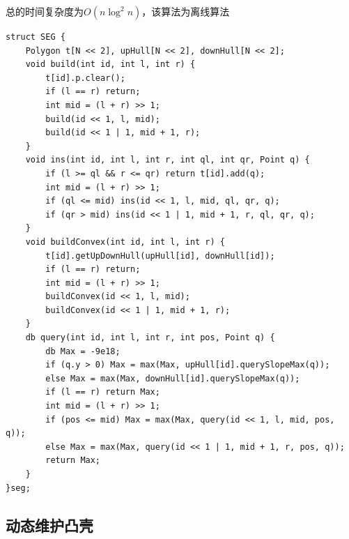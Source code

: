 总的时间复杂度为$O(n \log^2 n)$，该算法为离线算法\par

\begin{lstlisting}
struct SEG {
	Polygon t[N << 2], upHull[N << 2], downHull[N << 2]; 
	void build(int id, int l, int r) {
		t[id].p.clear();
		if (l == r) return;
		int mid = (l + r) >> 1;
		build(id << 1, l, mid);
		build(id << 1 | 1, mid + 1, r);
	}
	void ins(int id, int l, int r, int ql, int qr, Point q) {
		if (l >= ql && r <= qr) return t[id].add(q);
		int mid = (l + r) >> 1;
		if (ql <= mid) ins(id << 1, l, mid, ql, qr, q);
		if (qr > mid) ins(id << 1 | 1, mid + 1, r, ql, qr, q);
	}
	void buildConvex(int id, int l, int r) {
		t[id].getUpDownHull(upHull[id], downHull[id]);
		if (l == r) return;
		int mid = (l + r) >> 1;
		buildConvex(id << 1, l, mid);
		buildConvex(id << 1 | 1, mid + 1, r);
	}
	db query(int id, int l, int r, int pos, Point q) { 
		db Max = -9e18;
		if (q.y > 0) Max = max(Max, upHull[id].querySlopeMax(q));
		else Max = max(Max, downHull[id].querySlopeMax(q));
		if (l == r) return Max;
		int mid = (l + r) >> 1;
		if (pos <= mid) Max = max(Max, query(id << 1, l, mid, pos, q));
		else Max = max(Max, query(id << 1 | 1, mid + 1, r, pos, q));
		return Max;
	}
}seg;
\end{lstlisting}


\subsection{动态维护凸壳}

